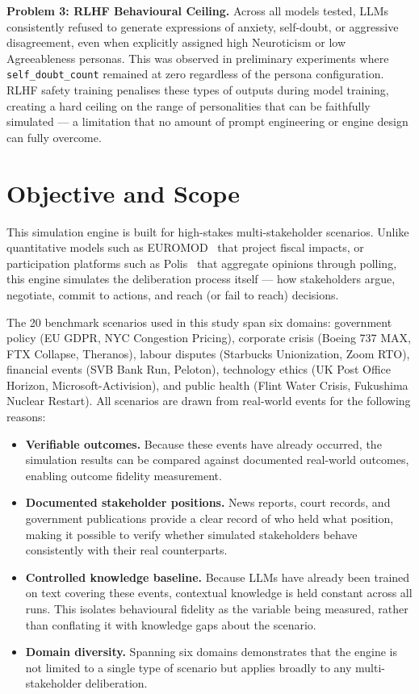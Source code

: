 \documentclass[12pt, a4paper]{report}
\begin{document}
\textbf{Problem 3: RLHF Behavioural Ceiling.} Across all models tested, LLMs consistently refused to generate expressions of anxiety, self-doubt, or aggressive disagreement, even when explicitly assigned high Neuroticism or low Agreeableness personas. This was observed in preliminary experiments where \texttt{self\_doubt\_count} remained at zero regardless of the persona configuration. RLHF safety training penalises these types of outputs during model training, creating a hard ceiling on the range of personalities that can be faithfully simulated --- a limitation that no amount of prompt engineering or engine design can fully overcome.


\section{Objective and Scope}

This simulation engine is built for high-stakes multi-stakeholder scenarios. Unlike quantitative models such as EUROMOD~\cite{euromod2024} that project fiscal impacts, or participation platforms such as Polis~\cite{polis2024} that aggregate opinions through polling, this engine simulates the deliberation process itself --- how stakeholders argue, negotiate, commit to actions, and reach (or fail to reach) decisions.

The 20 benchmark scenarios used in this study span six domains: government policy (EU GDPR, NYC Congestion Pricing), corporate crisis (Boeing 737 MAX, FTX Collapse, Theranos), labour disputes (Starbucks Unionization, Zoom RTO), financial events (SVB Bank Run, Peloton), technology ethics (UK Post Office Horizon, Microsoft-Activision), and public health (Flint Water Crisis, Fukushima Nuclear Restart). All scenarios are drawn from real-world events for the following reasons:

\begin{itemize}[leftmargin=*, itemsep=1pt]
    \item \textbf{Verifiable outcomes.} Because these events have already occurred, the simulation results can be compared against documented real-world outcomes, enabling outcome fidelity measurement.
    \item \textbf{Documented stakeholder positions.} News reports, court records, and government publications provide a clear record of who held what position, making it possible to verify whether simulated stakeholders behave consistently with their real counterparts.
    \item \textbf{Controlled knowledge baseline.} Because LLMs have already been trained on text covering these events, contextual knowledge is held constant across all runs. This isolates behavioural fidelity as the variable being measured, rather than conflating it with knowledge gaps about the scenario.
    \item \textbf{Domain diversity.} Spanning six domains demonstrates that the engine is not limited to a single type of scenario but applies broadly to any multi-stakeholder deliberation.
\end{itemize}
\end{document}
